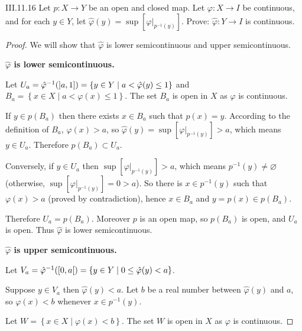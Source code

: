 \begin{problem}{III.11.16}
Let \( p: X \to Y \) be an open and closed map. Let \( \varphi: X \to I \) be continuous, and for each \( y \in Y \), let \( \hat{\varphi}(y) = \sup \left\lbrack\varphi\vert_{p^{-1}(y)} \right\rbrack \). Prove: \( \hat{\varphi}: Y \to I \) is continuous.
\end{problem}

\begin{proof}
	We will show that \( \hat{\varphi} \) is lower semicontinuous and upper semicontinuous.

	\textbf{\( \hat{\varphi} \) is lower semicontinuous.}

	Let \( U_{a} = \hat{\varphi}^{-1}(\left\rbrack{a, 1}\right\rbrack) = \left\{ y \in Y \mid a < \hat{\varphi}(y) \le 1 \right\} \) and \( B_{a} = \left\{ x \in X \mid a < \varphi(x) \le 1 \right\} \). The set \( B_{a} \) is open in \( X \) as \( \varphi \) is continuous.

	If \( y \in p(B_{a}) \) then there exists \( x \in B_{a} \) such that \( p(x) = y \). According to the definition of \( B_{a} \), \( \varphi(x) > a \), so \( \hat{\varphi}(y) = \sup \left\lbrack \varphi\vert_{p^{-1}(y)} \right\rbrack > a \), which means \( y \in U_{a} \). Therefore \( p(B_{a}) \subset U_{a} \).

	Conversely, if \( y \in U_{a} \) then \( \sup \left\lbrack \varphi\vert_{p^{-1}(y)} \right\rbrack > a \), which means \( p^{-1}(y) \ne \varnothing \) (otherwise, \( \sup \left\lbrack \varphi\vert_{p^{-1}(y)} \right\rbrack = 0 > a \)). So there is \( x \in p^{-1}(y) \) such that \( \varphi(x) > a \) (proved by contradiction), hence \( x \in B_{a} \) and \( y = p(x) \in p(B_{a}) \).

	Therefore \( U_{a} = p(B_{a}) \). Moreover \( p \) is an open map, so \( p(B_{a}) \) is open, and \( U_{a} \) is open. Thus \( \hat{\varphi} \) is lower semicontinuous.

	\textbf{\( \hat{\varphi} \) is upper semicontinuous.}

	Let \( V_{a} = \hat{\varphi}^{-1}(\left\lbrack{0, a}\right\lbrack) = \left\{ y \in Y \mid 0 \le \hat{\varphi}(y) < a \right\} \).

	Suppose \( y \in V_{a} \) then \( \hat{\varphi}(y) < a \). Let \( b \) be a real number between \( \hat{\varphi}(y) \) and \( a \), so \( \varphi(x) < b \) whenever \( x \in p^{-1}(y) \).

	Let \( W = \left\{ x \in X \mid \varphi(x) < b \right\} \). The set \( W \) is open in \( X \) as \( \varphi \) is continuous.


\end{proof}

